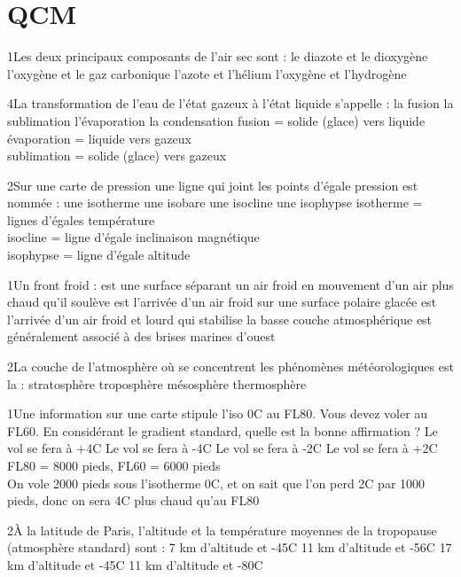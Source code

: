 \section{QCM}
{1}{Les deux principaux composants de l'air sec sont :}
{le diazote et le dioxygène}
{l'oxygène et le gaz carbonique}
{l'azote et l'hélium}
{l'oxygène et l'hydrogène} 
{}

{4}{La transformation de l'eau de l'état gazeux à l'état liquide s'appelle :}
{la fusion}
{la sublimation}
{l'évaporation}
{la condensation} 
{fusion = solide (glace) vers liquide \\ évaporation = liquide vers gazeux \\ sublimation = \pause solide (glace) vers gazeux }

{2}{Sur une carte de pression une ligne qui joint les points d'égale pression est nommée :}
{une isotherme}
{une isobare}
{une isocline}
{une isophypse} 
{isotherme = lignes d'égales température \\ isocline = ligne d'égale inclinaison magnétique \\ isophypse = ligne d'égale altitude}

{1}{Un front froid :}
{est une surface séparant un air froid en mouvement d'un air plus chaud qu'il soulève}
{est l'arrivée d'un air froid sur une surface polaire glacée}
{est l'arrivée d'un air froid et lourd qui stabilise la basse couche atmosphérique}
{est généralement associé à des brises marines d'ouest} 
{}

{2}{La couche de l'atmosphère où se concentrent les phénomènes météorologiques est la :}
{stratosphère}
{troposphère}
{mésosphère}
{thermosphère} 
{}

{1}{Une information sur une carte stipule l'iso 0\textdegree C au FL80. Vous devez voler au FL60. En considérant le gradient standard, quelle est la bonne affirmation ?}
{Le vol se fera à +4\textdegree C}
{Le vol se fera à -4\textdegree C}
{Le vol se fera à -2\textdegree C}
{Le vol se fera à +2\textdegree C} 
{FL80 = 8000 pieds, FL60 = 6000 pieds \\ On vole 2000 pieds sous l'isotherme 0\textdegree C, et on sait que l'on perd 2\textdegree C par 1000 pieds, donc on sera 4\textdegree C plus chaud qu'au FL80}

{2}{À la latitude de Paris, l'altitude et la température moyennes de la tropopause (atmosphère standard) sont :}
{7 km d'altitude et -45\textdegree C}
{11 km d'altitude et -56\textdegree C}
{17 km d'altitude et -45\textdegree C}
{11 km d'altitude et -80\textdegree C} 
{}

